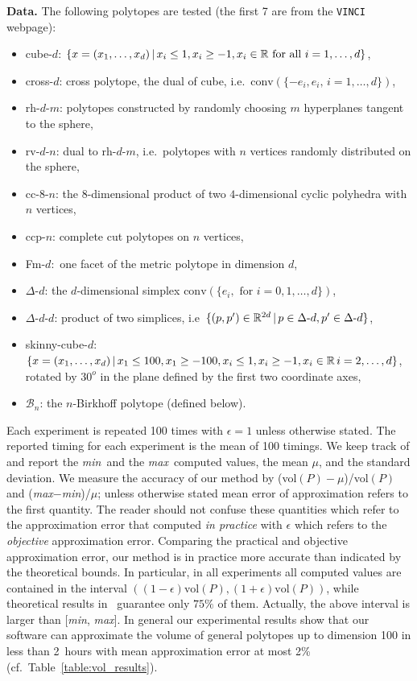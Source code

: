 \documentclass[11pt,a4paper]{article}
\def\B{{\mathcal B}} \def\E{{\mathcal E}}
\def\vol{\mbox{vol}}
\def\vol{\mbox{vol}}
\def\Min{{\it min}}
\def\Max{{\it max}}
\begin{document}
\vspace{.5em}
\textbf{Data.}
The following polytopes are tested (the first 7 are from the {\tt VINCI} 
webpage):\vspace{-.2cm}
\begin{itemize}\itemsep-.3em
\item cube-$d$:  $\{x=(x_1,\dots,x_d)\, |\, x_i\leq1, x_i\geq-1, x_i\in{\mathbb R}
\text{ for all } i=1,\dots,d \}$,
\item cross-$d$: cross polytope, the dual of cube, i.e.\
$\mbox{conv}(\{-e_i,e_i,\, i=1,\dots,d\})$,
\item rh-$d$-$m$: polytopes constructed by randomly choosing $m$ hyperplanes tangent to the sphere, \item rv-$d$-$n$: dual to rh-$d$-$m$, i.e.\ polytopes with $n$ vertices randomly distributed on the sphere,
\item cc-8-$n$: the $8$-dimensional product of two $4$-dimensional cyclic polyhedra with $n$ vertices, \item ccp-$n$: complete cut polytopes on $n$ vertices,
\item Fm-$d$:\ one facet of the metric polytope in dimension $d$,
\item $\Delta$-$d$: the $d$-dimensional simplex $\mbox{conv}(\{e_i,\text{ for } i=0,1,\dots,d\})$,
\item $\Delta$-$d$-$d$: product of two simplices, i.e\ $\{(p, p') \in {\mathbb R}^{2d}\, |\, p \in \Delta\mbox{-}d, p' \in \Delta\mbox{-}d\}$,
\item skinny-cube-$d$:  $\{x=(x_1,\dots,x_d) \, |\, x_1\leq100, x_1\geq-100, x_i\leq1, x_i\geq-1, x_i\in{\mathbb R} \, i=2,\dots,d \}$, 
rotated by $30^o$ in the plane defined by the first two coordinate axes,
\item $\B_n$: the $n$-Birkhoff polytope (defined below).
\end{itemize}

Each experiment is repeated 100 times with $\epsilon=1$ unless otherwise stated. 
The reported timing for each experiment is the mean of 100 timings. 
We keep track of and report the \Min\ and the \Max\ computed values,
the mean $\mu$, and the standard deviation.  We measure the accuracy of our method by (\vol$(P)-\mu$)/\vol$(P)$ and (\Max$-$\Min)/$\mu$; unless otherwise stated mean error of approximation refers to the first quantity. 
The reader should not confuse these quantities which refer to the approximation error that computed {\it in practice} with $\epsilon$ which refers to the {\it objective} approximation error.
Comparing the practical and objective approximation error, our method is in practice more accurate than indicated by the theoretical bounds.
In particular, in all experiments all computed values are contained in the
interval $((1-\epsilon)\vol(P),(1+\epsilon)\vol(P))$,
while theoretical results in~\cite{KannanLS97} guarantee only $75\%$ of them.
Actually, the above interval is larger than [\Min, \Max].
In general our experimental results show that our software can approximate
the volume of general polytopes up to dimension 100 in less than 2~hours
with mean approximation error at most 2\% (cf.\ Table~\ref{table:vol_results}).
\end{document}
